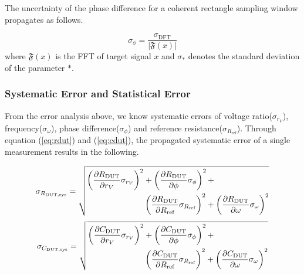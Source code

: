 \documentclass[%
 aip,
 amsmath,amssymb,
 reprint,%
]{revtex4-1}
\begin{document}
The uncertainty of the phase difference for a coherent rectangle sampling window propagates as follows\cite{phaseDetection}.

\begin{equation}
    \sigma_{\phi}  = \frac{\sigma_{\textrm{DFT}}}{\left| \mathfrak{F}(x) \right|}
\end{equation}
\noindent where $\mathfrak{F}(x)$ is the FFT of target signal $x$ and $\sigma_{*}$ denotes the standard deviation of the parameter $*$.

\subsubsection{Systematic Error and Statistical Error}

From the error analysis above, we know systematic errors of voltage ratio($\sigma_{r_V}$), frequency($\sigma_{\omega}$), phase difference($\sigma_{\phi}$) and reference resistance($\sigma_{R_{\textrm{ref}}}$). Through equation (\ref{eq:rdut}) and (\ref{eq:cdut}), the propagated systematic error of a single measurement results in the following.

\begin{equation}
\sigma_{R_{\textrm{DUT,sys}}} = \sqrt{
    \begin{aligned}
    \left({\partial R_{\textrm{DUT}} \over \partial r_V}\sigma_{r_V}\right)^2&+\left({\partial R_{\textrm{DUT}} \over \partial \phi}\sigma_{\phi}\right)^2+\\
    &\left({\partial R_{\textrm{DUT}} \over \partial R_{\textrm{ref}}}\sigma_{R_{\textrm{ref}}}\right)^2+\left({\partial R_{\textrm{DUT}} \over \partial \omega}\sigma_{\omega}\right)^2
    \end{aligned}
    }\label{eqn:rduterror}
    \end{equation}
\begin{equation}
    \sigma_{C_{\textrm{DUT,sys}}} = \sqrt{
    \begin{aligned}
    \left({\partial C_{\textrm{DUT}} \over \partial r_V}\sigma_{r_V}\right)^2&+\left({\partial C_{\textrm{DUT}} \over \partial \phi}\sigma_{\phi}\right)^2+\\
    &\left({\partial C_{\textrm{DUT}} \over \partial R_{\textrm{ref}}}\sigma_{R_{\textrm{ref}}}\right)^2+\left({\partial C_{\textrm{DUT}} \over \partial \omega}\sigma_{\omega}\right)^2
    \end{aligned}
    }\label{cduterror}
\end{equation}
\end{document}
